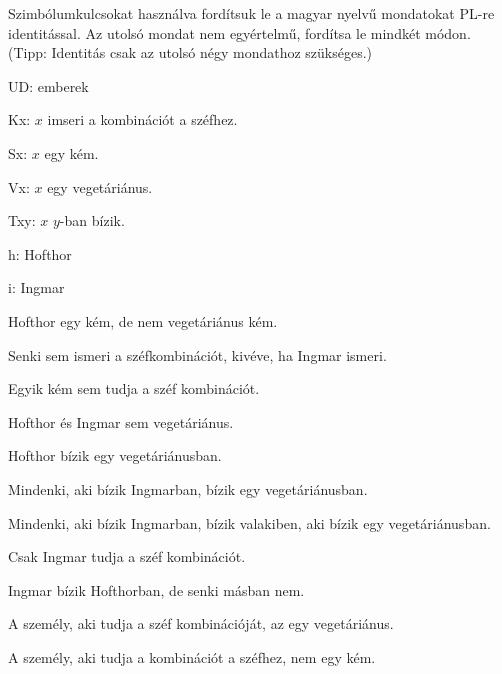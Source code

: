 \problempart
Szimbólumkulcsokat használva fordítsuk le a magyar nyelvű mondatokat PL-re identitással. Az utolsó mondat nem egyértelmű, fordítsa le mindkét módon. (Tipp: Identitás csak az utolsó négy mondathoz szükséges.)
\begin{ekey}
\item[UD:] emberek
\item[Kx:] $x$ imseri a kombinációt a széfhez.
\item[Sx:] $x$ egy kém.
\item[Vx:] $x$ egy vegetáriánus.
\item[Txy:] $x$ $y$-ban bízik.
\item[h:] Hofthor
\item[i:] Ingmar
\end{ekey}
\begin{earg}
\item Hofthor egy kém, de nem vegetáriánus kém.
\item Senki sem ismeri a széfkombinációt, kivéve, ha Ingmar ismeri.
\item Egyik kém sem tudja a széf kombinációt.
\item Hofthor és Ingmar sem vegetáriánus.
\item Hofthor bízik egy vegetáriánusban.
\item Mindenki, aki bízik Ingmarban, bízik egy vegetáriánusban.
\item Mindenki, aki bízik Ingmarban, bízik valakiben, aki bízik egy vegetáriánusban.
\item Csak Ingmar tudja a széf kombinációt.
\item Ingmar bízik Hofthorban, de senki másban nem.
\item A személy, aki tudja a széf kombinációját, az egy vegetáriánus.
\item A személy, aki tudja a kombinációt a széfhez, nem egy kém.
\end{earg}



